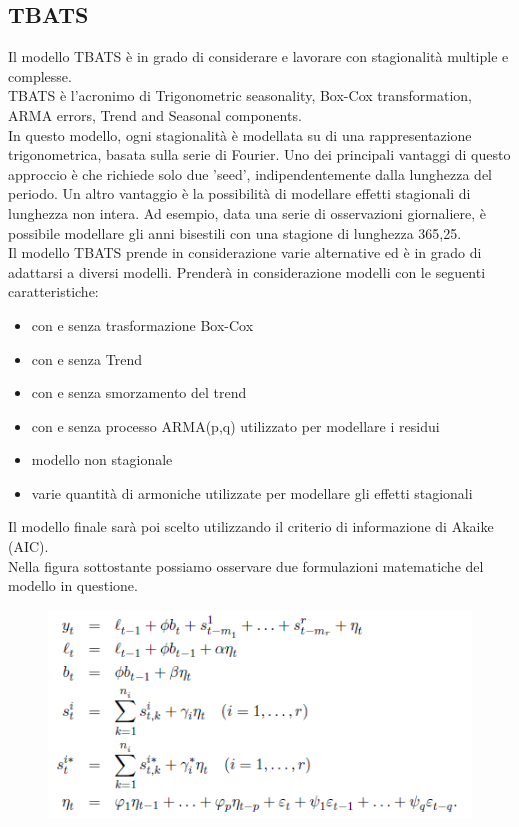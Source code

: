 \documentclass[12pt, a4paper, twocolumn]{article} %
\begin{document}
\subsection{TBATS}
Il modello TBATS è in grado di considerare e lavorare con stagionalità multiple e complesse.\\
TBATS è l'acronimo di Trigonometric seasonality, Box-Cox transformation, ARMA errors, Trend and Seasonal components.\\
In questo modello, ogni stagionalità è modellata su di una rappresentazione trigonometrica, basata sulla serie di Fourier. Uno dei principali vantaggi di questo approccio è che richiede solo due 'seed', indipendentemente dalla lunghezza del periodo. Un altro vantaggio è la possibilità di modellare effetti stagionali di lunghezza non intera. Ad esempio, data una serie di osservazioni giornaliere, è possibile modellare gli anni bisestili con una stagione di lunghezza 365,25.\\
Il modello TBATS prende in considerazione varie alternative ed è in grado di adattarsi a diversi modelli. Prenderà in considerazione modelli con le seguenti caratteristiche:
\begin{itemize}
\item con e senza trasformazione Box-Cox
\item con e senza Trend
\item con e senza smorzamento del trend
\item con e senza processo ARMA(p,q) utilizzato per modellare i residui
\item modello non stagionale
\item varie quantità di armoniche utilizzate per modellare gli effetti stagionali
\end{itemize}
Il modello finale sarà poi scelto utilizzando il criterio di informazione di Akaike (AIC).\\
Nella figura sottostante possiamo osservare due formulazioni matematiche del modello in questione.

\begin{figure}[H]
  \caption{\protect\cite{dispensa}}
  \begin{center}
    \includegraphics{tbats.png}
  \end{center}
\end{figure}
\end{document}
